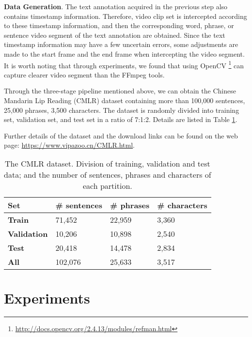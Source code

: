 \documentclass[sigconf]{acmart}
\begin{document}
\textbf{Data Generation}. 
The text annotation acquired in the previous step also contains timestamp information. Therefore, video clip set is intercepted according to these timestamp information, and then the corresponding word, phrase, or sentence video segment of the text annotation are obtained.
Since the text timestamp information may have a few uncertain errors, some adjustments are made to the start frame and the end frame when intercepting the video segment. It is worth noting that through experiments, we found that using OpenCV \footnote{\url{http://docs.opencv.org/2.4.13/modules/refman.html}} can capture clearer video segment than the FFmpeg tools.

Through the three-stage pipeline mentioned above, we can obtain the Chinese Mandarin Lip Reading (CMLR) dataset containing more than 100,000 sentences, 25,000 phrases, 3,500 characters. The dataset is randomly divided into training set, validation set, and test set in a ratio of 7:1:2. Details are listed in Table \ref{table:dataset}.

Further details of the dataset and the download links can be found on the web page: \url{https://www.vipazoo.cn/CMLR.html}.

\begin{table}
\caption {The CMLR dataset. Division of training, validation and test data; and the number of sentences, phrases and characters of each partition.}
\label{table:dataset}
\centering
\begin{tabular}{p{1.3cm}<{\centering} | p{1.8cm}<{\centering} | p{1.6cm}<{\centering} | p{1.8cm}<{\centering}}
  \hline \textbf{Set} & \textbf{\# sentences} & \textbf{\# phrases} & \textbf{\# characters} \\ \hline \hline 
    \textbf{Train} &  71,452  &  22,959  &  3,360    \\ \hline
    \textbf{Validation}   &  10,206  &  10,898  &  2,540    \\ \hline
    \textbf{Test}  &  20,418  &  14,478  &  2,834    \\ \hline \hline 
    
    \textbf{All}   &  102,076 &  25,633  &  3,517    \\ \hline
\end{tabular}
\end{table}

\section{Experiments}
\end{document}
